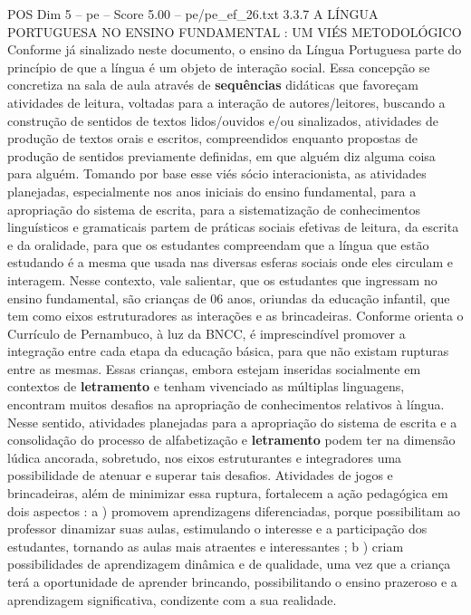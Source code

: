 \begin{textsample}{POS Dim 5 – pe – Score 5.00 – pe/pe\_ef\_26.txt}  \label{ex:f5_pos_206}
3.3.7 A LÍNGUA PORTUGUESA NO ENSINO FUNDAMENTAL : UM VIÉS METODOLÓGICO Conforme já sinalizado neste documento, o ensino da Língua Portuguesa parte do princípio de que a língua é um objeto de interação social.
Essa concepção se concretiza na sala de aula através de \textbf{sequências} didáticas que favoreçam atividades de leitura, voltadas para a interação de autores/leitores, buscando a construção de sentidos de textos lidos/ouvidos e/ou sinalizados, atividades de produção de textos orais e escritos, compreendidos enquanto propostas de produção de sentidos previamente definidas, em que alguém diz alguma coisa para alguém.
Tomando por base esse viés sócio interacionista, as atividades planejadas, especialmente nos anos iniciais do ensino fundamental, para a apropriação do sistema de escrita, para a sistematização de conhecimentos linguísticos e gramaticais partem de práticas sociais efetivas de leitura, da escrita e da oralidade, para que os estudantes compreendam que a língua que estão estudando é a mesma que usada nas diversas esferas sociais onde eles circulam e interagem.
Nesse contexto, vale salientar, que os estudantes que ingressam no ensino fundamental, são crianças de 06 anos, oriundas da educação infantil, que tem como eixos estruturadores as interações e as brincadeiras.
Conforme orienta o Currículo de Pernambuco, à luz da BNCC, é imprescindível promover a integração entre cada etapa da educação básica, para que não existam rupturas entre as mesmas.
Essas crianças, embora estejam inseridas socialmente em contextos de \textbf{letramento} e tenham vivenciado as múltiplas linguagens, encontram muitos desafios na apropriação de conhecimentos relativos à língua.
Nesse sentido, atividades planejadas para a apropriação do sistema de escrita e a consolidação do processo de alfabetização e \textbf{letramento} podem ter na dimensão lúdica ancorada, sobretudo, nos eixos estruturantes e integradores uma possibilidade de atenuar e superar tais desafios.
Atividades de jogos e brincadeiras, além de minimizar essa ruptura, fortalecem a ação pedagógica em dois aspectos : a ) promovem aprendizagens diferenciadas, porque possibilitam ao professor dinamizar suas aulas, estimulando o interesse e a participação dos estudantes, tornando as aulas mais atraentes e interessantes ; b ) criam possibilidades de aprendizagem dinâmica e de qualidade, uma vez que a criança terá a oportunidade de aprender brincando, possibilitando o ensino prazeroso e a aprendizagem significativa, condizente com a sua realidade.

\end{textsample}
